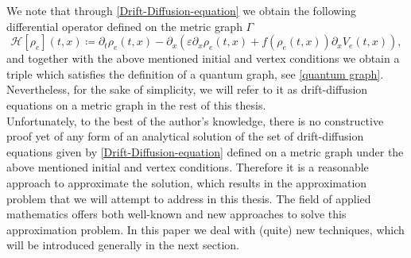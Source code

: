 We note that through \cref{Drift-Diffusion-equation} we obtain the following differential operator defined on the metric graph $\Gamma$
\begin{equation} 
    \label{eq:Hamiltonian}
    \mathcal{H} [\rho_e] (t,x) \coloneqq \partial_t \rho_e (t,x)  - \partial_x (\varepsilon \partial_x \rho_e (t,x) + f(\rho_e (t,x) ) \partial_x V_e (t,x)),
\end{equation}
and together with the above mentioned initial and vertex conditions we obtain a triple which satisfies the definition of a quantum graph, see \cref{quantum graph}. Nevertheless, for the sake of simplicity, we will refer to it as drift-diffusion equations on a metric graph in the rest of this thesis. \\
Unfortunately, to the best of the author's knowledge, there is no constructive proof yet of any form of an analytical solution of the set of drift-diffusion equations given by \cref{Drift-Diffusion-equation} defined on a metric graph under the above mentioned initial and vertex conditions. Therefore it is a reasonable approach to approximate the solution, which results in the approximation problem that we will attempt to address in this thesis. The field of applied mathematics offers both well-known and new approaches to solve this approximation problem. In this paper we deal with (quite) new techniques, which will be introduced generally in the next section. 




